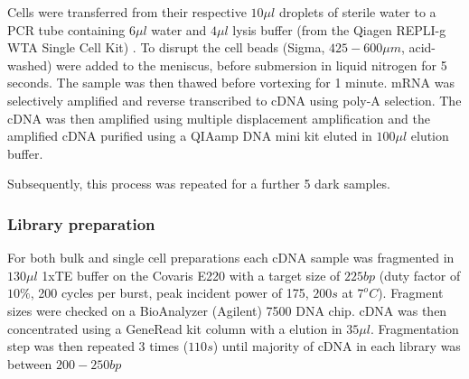 Cells were transferred from their respective \(10\mu l\) droplets of sterile water to
a PCR tube containing \(6\mu l\) water and \(4\mu l \) lysis buffer (from the Qiagen
REPLI-g WTA Single Cell Kit) \citep{Korfhage2015}. To disrupt the cell beads (Sigma, \(425-600\mu m\), acid-washed)
were added to the meniscus, before submersion in liquid nitrogen for 5 seconds.  The sample was 
then thawed before vortexing for 1 minute.  
mRNA was selectively amplified and reverse transcribed to cDNA using poly-A selection.  The cDNA
was then amplified using multiple displacement amplification and the amplified cDNA purified
using a QIAamp DNA mini kit eluted in \(100\mu l\) elution buffer.

Subsequently, this process was repeated for a further 5 dark samples.


\subsubsection{Library preparation}

For both bulk and single cell preparations each cDNA sample was fragmented in \(130\mu l\) 1xTE buffer on the Covaris E220 
with a target size of \(225bp\) (duty factor of \(10\%\), 200 cycles per burst, peak incident power
of 175, \(200s\) at \(7^{o}C\)). Fragment sizes were checked on a BioAnalyzer (Agilent) 7500 DNA chip.
cDNA was then concentrated using a GeneRead kit column with a elution in \(35\mu l\). Fragmentation
step was then repeated 3 times (\(110s\)) until majority of cDNA in each library was between \(200-250bp\)

